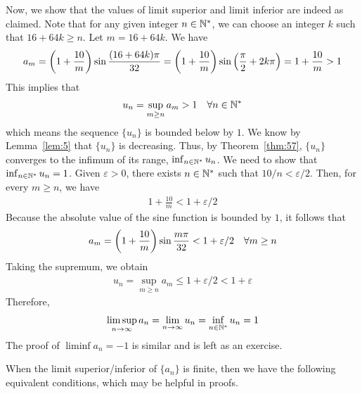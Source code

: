 \documentclass[thmcnt=section, 12pt]{my-elegantbook}
\begin{document}
\begin{example}
    Now, we show that the values of limit superior and limit inferior are indeed as claimed. Note that for any given integer $n \in \mathbb{N}^\ast$, we can choose an integer $k$ such that $16 + 64k \geq n$. Let $m = 16 + 64k$. We have
    \begin{align*}
        a_m = \left( 1 + \frac{10}{m} \right) \sin \frac{(16 + 64k) \pi}{32}
        = \left( 1 + \frac{10}{m} \right) \sin \left( 
            \frac{\pi}{2} + 2k\pi
         \right)
        = 1 + \frac{10}{m}
        > 1
    \end{align*}
    This implies that
    \begin{align}
        u_n = \sup_{m \geq n} a_m > 1
        \quad \forall n \in \mathbb{N}^\ast
    \end{align}
    which means the sequence $\{u_n\}$ is bounded below by $1$. We know by Lemma~\ref{lem:5} that $\{u_n\}$ is decreasing. Thus, by Theorem~\ref{thm:57}, $\{u_n\}$ converges to the infimum of its range, $\inf_{n \in \mathbb{N}^\ast} u_n$. We need to show that $\inf_{n \in \mathbb{N}^\ast} u_n = 1$. Given $\varepsilon > 0$, there exists $n \in \mathbb{N}^\ast$ such that $10 / n < \varepsilon/2$. Then, for every $m \geq n$, we have
    \begin{align*}
        1 + \frac{10}{m} < 1 + \varepsilon/2
    \end{align*}
    Because the absolute value of the sine function is bounded by $1$, it follows that
    \begin{align*}
        a_m = \left( 1 + \frac{10}{m} \right) \sin \frac{m \pi}{32} < 1 + \varepsilon/2
        \quad \forall m \geq n
    \end{align*}
    Taking the supremum, we obtain
    \begin{align*}
        u_n = \sup_{m \geq n} a_m
        \leq 1 + \varepsilon/2
        < 1 + \varepsilon
    \end{align*}
    Therefore,
    \begin{align*}
        \limsup_{n \to \infty} a_n
        = \lim_{n \to \infty} u_n
        = \inf_{n \in \mathbb{N}^\ast} u_n = 1
    \end{align*}
    The proof of $\liminf a_n = -1$ is similar and is left as an exercise.
\end{example}


When the limit superior/inferior of $\{a_n\}$ is finite, then we have the following equivalent conditions, which may be helpful in proofs.
\end{document}
